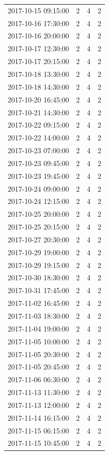 \begin{tabular}{lrrr}
2017-10-15 09:15:00 & 2 & 4 & 2 \\
2017-10-16 17:30:00 & 2 & 4 & 2 \\
2017-10-16 20:00:00 & 2 & 4 & 2 \\
2017-10-17 12:30:00 & 2 & 4 & 2 \\
2017-10-17 20:15:00 & 2 & 4 & 2 \\
2017-10-18 13:30:00 & 2 & 4 & 2 \\
2017-10-18 14:30:00 & 2 & 4 & 2 \\
2017-10-20 16:45:00 & 2 & 4 & 2 \\
2017-10-21 14:30:00 & 2 & 4 & 2 \\
2017-10-22 09:15:00 & 2 & 4 & 2 \\
2017-10-22 14:00:00 & 2 & 4 & 2 \\
2017-10-23 07:00:00 & 2 & 4 & 2 \\
2017-10-23 09:45:00 & 2 & 4 & 2 \\
2017-10-23 19:45:00 & 2 & 4 & 2 \\
2017-10-24 09:00:00 & 2 & 4 & 2 \\
2017-10-24 12:15:00 & 2 & 4 & 2 \\
2017-10-25 20:00:00 & 2 & 4 & 2 \\
2017-10-25 20:15:00 & 2 & 4 & 2 \\
2017-10-27 20:30:00 & 2 & 4 & 2 \\
2017-10-29 19:00:00 & 2 & 4 & 2 \\
2017-10-29 19:15:00 & 2 & 4 & 2 \\
2017-10-30 18:30:00 & 2 & 4 & 2 \\
2017-10-31 17:45:00 & 2 & 4 & 2 \\
2017-11-02 16:45:00 & 2 & 4 & 2 \\
2017-11-03 18:30:00 & 2 & 4 & 2 \\
2017-11-04 19:00:00 & 2 & 4 & 2 \\
2017-11-05 10:00:00 & 2 & 4 & 2 \\
2017-11-05 20:30:00 & 2 & 4 & 2 \\
2017-11-05 20:45:00 & 2 & 4 & 2 \\
2017-11-06 06:30:00 & 2 & 4 & 2 \\
2017-11-13 11:30:00 & 2 & 4 & 2 \\
2017-11-13 12:00:00 & 2 & 4 & 2 \\
2017-11-14 16:15:00 & 2 & 4 & 2 \\
2017-11-15 06:15:00 & 2 & 4 & 2 \\
2017-11-15 10:45:00 & 2 & 4 & 2 \\

\end{tabular}
